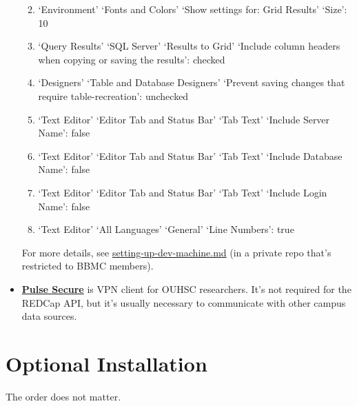 \documentclass[]{book}
\begin{document}
\begin{itemize}
  \begin{enumerate}
  \def\labelenumi{\arabic{enumi}.}
  \item
    `Environment' \textbar{} `Fonts and Colors' \textbar{} `Show settings for: Grid Results' \textbar{} `Size': 10
  \item
    `Query Results' \textbar{} `SQL Server' \textbar{} `Results to Grid' \textbar{} `Include column headers when copying or saving the results': checked
  \item
    `Designers' \textbar{} `Table and Database Designers' \textbar{} `Prevent saving changes that require table-recreation': unchecked
  \item
    `Text Editor' \textbar{} `Editor Tab and Status Bar' \textbar{} `Tab Text' \textbar{} `Include Server Name': false
  \item
    `Text Editor' \textbar{} `Editor Tab and Status Bar' \textbar{} `Tab Text' \textbar{} `Include Database Name': false
  \item
    `Text Editor' \textbar{} `Editor Tab and Status Bar' \textbar{} `Tab Text' \textbar{} `Include Login Name': false
  \item
    `Text Editor' \textbar{} `All Languages' \textbar{} `General' \textbar{} `Line Numbers': true
  \end{enumerate}

  For more details, see \href{https://github.com/OuhscBbmc/bbmc-database-management/blob/master/maintenance/setting-up-server/setting-up-dev-machine.md}{setting-up-dev-machine.md} (in a private repo that's restricted to BBMC members).
\item
  \textbf{\href{https://connect.ouhsc.edu}{Pulse Secure}} is VPN client for OUHSC researchers. It's not required for the REDCap API, but it's usually necessary to communicate with other campus data sources.
\end{itemize}

\hypertarget{installation-optional}{%
\section{Optional Installation}\label{installation-optional}}

The order does not matter.
\end{document}
